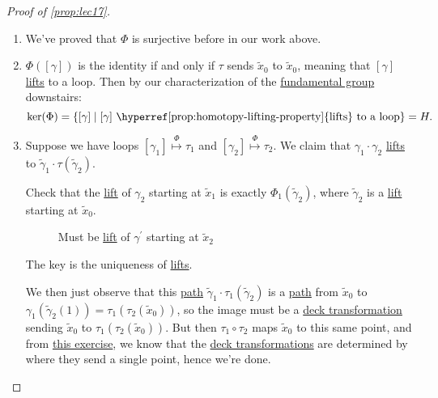 \begin{proof}[Proof of \autoref{prop:lec17}]
	\begin{enumerate}[(1)]
		\item We've proved that \(\Phi \) is surjective before in our work above.
		\item \(\Phi ([\gamma ])\) is the identity if and only if \(\tau \) sends \(\widetilde{x} _0\) to \(\widetilde{x} _0\), meaning that \([\gamma ]\)
		      \hyperref[prop:homotopy-lifting-property]{lifts} to a loop. Then by our characterization of the \hyperref[def:fundamental-group]{fundamental group} downstairs:
		      \[
			      \ker (\Phi ) = \left\{[\gamma ] \mid \text{\([\gamma ]\) \hyperref[prop:homotopy-lifting-property]{lifts} to a loop} \right\} = H.
		      \]
		\item Suppose we have loops \([\gamma _1]\overset{\Phi }{\mapsto } \tau _1\) and \([\gamma _2]\overset{\Phi }{\mapsto }\tau _2\). We claim that \(\gamma _1\cdot \gamma _2\)
		      \hyperref[prop:homotopy-lifting-property]{lifts} to \(\widetilde{\gamma} _1\cdot \tau (\widetilde{\gamma} _2)\).
		      \begin{figure}[H]
			      \centering
			      \label{fig:pf:prop:lec17-1}
		      \end{figure}
		      \begin{exercise}
			      Check that the \hyperref[def:lift]{lift} of \(\gamma _2\) starting at \(\widetilde{x} _1\) is exactly
			      \(\Phi _1(\widetilde{\gamma} _2)\), where \(\widetilde{\gamma} _2\) is a \hyperref[def:lift]{lift} starting at \(\widetilde{x} _0\).
			      \begin{figure}[H]
				      \centering
				      \caption{Must be \hyperref[def:lift]{lift} of \(\gamma ^\prime \) starting at \(\widetilde{x} _2\)}
				      \label{fig:pf:prop:lec17-2}
			      \end{figure}
		      \end{exercise}
		      \begin{answer}
			      The key is the uniqueness of \hyperref[prop:homotopy-lifting-property]{lifts}.
		      \end{answer}

		      We then just observe that this \hyperref[def:path]{path} \(\widetilde{\gamma} _1\cdot \tau _1(\widetilde{\gamma} _2)\) is a \hyperref[def:path]{path}
		      from \(\widetilde{x} _0\) to \(\gamma_1(\widetilde{\gamma} _2(1)) = \tau_1(\tau _2(\widetilde{x} _0))\), so the image must be a
		      \hyperref[def:deck-transformation]{deck transformation} sending \(\widetilde{x} _0\) to \(\tau _1(\tau _2(\widetilde{x} _0))\). But then \(\tau _1\circ \tau _2\)
		      maps \(\widetilde{x} _0\) to this same point, and from \hyperref[ex:lec17]{this exercise}, we know that the \hyperref[def:deck-transformation]{deck transformations}
		      are determined by where they send a single point, hence we're done.
	\end{enumerate}
\end{proof}

